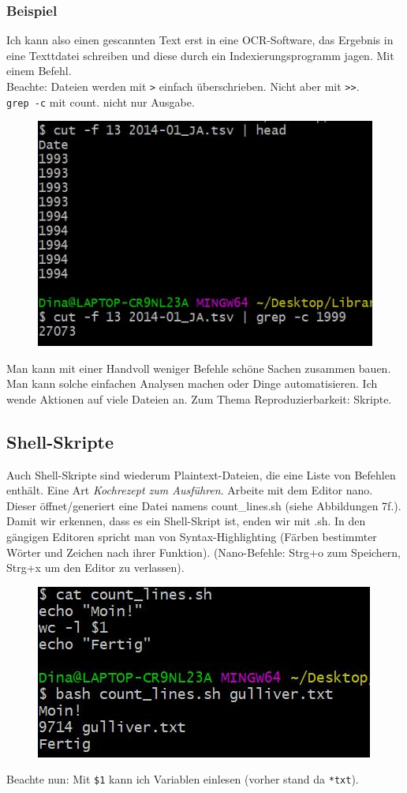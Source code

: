 \documentclass[11pt, a4paper, german]{article}
\begin{document}
\subsubsection*{Beispiel}
Ich kann also einen gescannten Text erst in eine OCR-Software, das Ergebnis in eine Texttdatei schreiben und diese durch ein Indexierungsprogramm jagen. Mit einem Befehl. \\

Beachte: Dateien werden mit \texttt{>} einfach überschrieben. Nicht aber mit \texttt{>>}.\\

\texttt{grep -c} mit count. nicht nur Ausgabe. 

\begin{figure}[h]
	\centering
	\includegraphics[width=0.7\linewidth]{bild8}
	\caption{}
	\label{fig:bild8}
\end{figure}
 
 Man kann mit einer Handvoll weniger Befehle schöne Sachen zusammen bauen. Man kann solche einfachen Analysen machen oder Dinge automatisieren. Ich wende Aktionen auf viele Dateien an. 
 Zum Thema Reproduzierbarkeit: Skripte. 
 
 \subsection{Shell-Skripte}
 Auch Shell-Skripte sind wiederum Plaintext-Dateien, die eine Liste von Befehlen enthält. Eine Art \emph{Kochrezept zum Ausführen}. 
 Arbeite mit dem Editor nano. Dieser öffnet/generiert eine Datei namens count\_lines.sh (siehe Abbildungen 7f.). Damit wir erkennen, dass es ein Shell-Skript ist, enden wir mit .sh. In den gängigen Editoren spricht man von Syntax-Highlighting (Färben bestimmter Wörter und Zeichen nach ihrer Funktion). (Nano-Befehle: Strg+o zum Speichern, Strg+x um den Editor zu verlassen).
 \begin{figure}[h]
 	\centering
 	\includegraphics[width=0.7\linewidth]{bild9}
 	\caption{}
 	\label{fig:bild9}
 \end{figure}
  Beachte nun: Mit \texttt{\$1} kann ich Variablen einlesen (vorher stand da \texttt{*txt}). 
  
\end{document}
